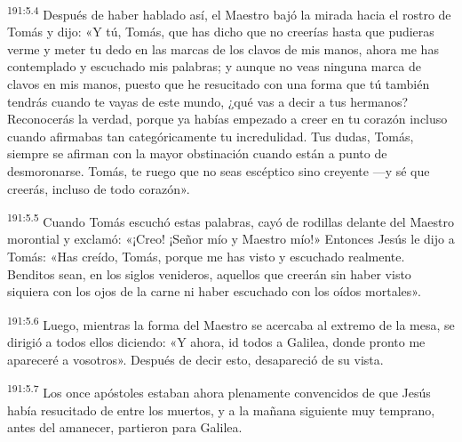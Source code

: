 \par 
\textsuperscript{191:5.4} Después de haber hablado así, el Maestro bajó la mirada hacia el rostro de Tomás y dijo: «Y tú, Tomás, que has dicho que no creerías hasta que pudieras verme y meter tu dedo en las marcas de los clavos de mis manos, ahora me has contemplado y escuchado mis palabras; y aunque no veas ninguna marca de clavos en mis manos, puesto que he resucitado con una forma que tú también tendrás cuando te vayas de este mundo, ¿qué vas a decir a tus hermanos? Reconocerás la verdad, porque ya habías empezado a creer en tu corazón incluso cuando afirmabas tan categóricamente tu incredulidad. Tus dudas, Tomás, siempre se afirman con la mayor obstinación cuando están a punto de desmoronarse. Tomás, te ruego que no seas escéptico sino creyente ---y sé que creerás, incluso de todo corazón».

\par 
\textsuperscript{191:5.5} Cuando Tomás escuchó estas palabras, cayó de rodillas delante del Maestro morontial y exclamó: «¡Creo! ¡Señor mío y Maestro mío!» Entonces Jesús le dijo a Tomás: «Has creído, Tomás, porque me has visto y escuchado realmente. Benditos sean, en los siglos venideros, aquellos que creerán sin haber visto siquiera con los ojos de la carne ni haber escuchado con los oídos mortales».

\par 
\textsuperscript{191:5.6} Luego, mientras la forma del Maestro se acercaba al extremo de la mesa, se dirigió a todos ellos diciendo: «Y ahora, id todos a Galilea, donde pronto me apareceré a vosotros». Después de decir esto, desapareció de su vista.

\par 
\textsuperscript{191:5.7} Los once apóstoles estaban ahora plenamente convencidos de que Jesús había resucitado de entre los muertos, y a la mañana siguiente muy temprano, antes del amanecer, partieron para Galilea.

